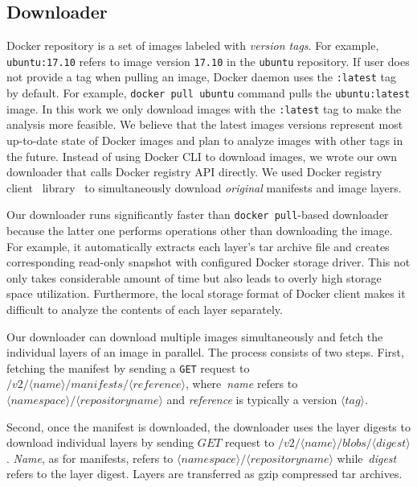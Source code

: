 \subsection{Downloader}
\label{sec:downloader}

Docker repository is a set of images labeled with \emph{version tags}.
%
For example, \texttt{ubuntu:17.10} refers to image version \texttt{17.10} in the
\texttt{ubuntu} repository.
%
If user does not provide a tag when pulling an image, 
Docker daemon uses the \texttt{:latest} tag by default.
For example, \texttt{docker pull ubuntu} command pulls the
\texttt{ubuntu:latest} image.
%
In this work we only download images with the \texttt{:latest} tag to
make the analysis more feasible.  We believe that the latest
images versions represent most up-to-date state of Docker images
%
and plan to analyze images with other tags in the future.
Instead of using Docker CLI to download images,
we wrote our own downloader that calls Docker registry API directly.
We used Docker registry client~ library~\cite{dockerregistryclient} to simultaneously
download \emph{original} manifests and image layers. 

Our downloader runs significantly
faster than \texttt{docker pull}-based downloader
because the latter one performs
operations other than downloading the
image.
For example, it automatically extracts each layer's tar archive file
and creates corresponding read-only snapshot with configured Docker storage driver.
This
not only takes considerable amount of time but also leads
to overly high storage space utilization.
%
Furthermore, the local storage format of Docker client makes it difficult
to analyze the contents of each layer separately.

Our downloader can download multiple images simultaneously and fetch
the individual layers of an image in parallel.
%
The process consists of two steps.
%
First, fetching the manifest by sending a \texttt{GET} request to
$/v2/\langle name \rangle/manifests/\langle reference \rangle$,
where~\textit{name} refers to
$\langle namespace\rangle/\langle repository name \rangle$
and \textit{reference} is typically a version $\langle tag \rangle$.

Second, once the manifest is downloaded, the downloader uses the layer digests to
download individual layers
by sending $GET$ request to $/v2/\langle name \rangle/blobs/\langle digest \rangle$.
\textit{Name}, as for manifests,
refers to $\langle namespace\rangle/\langle repository name \rangle$
while~\textit{digest} refers to the layer digest.
Layers are transferred as gzip compressed tar archives.

